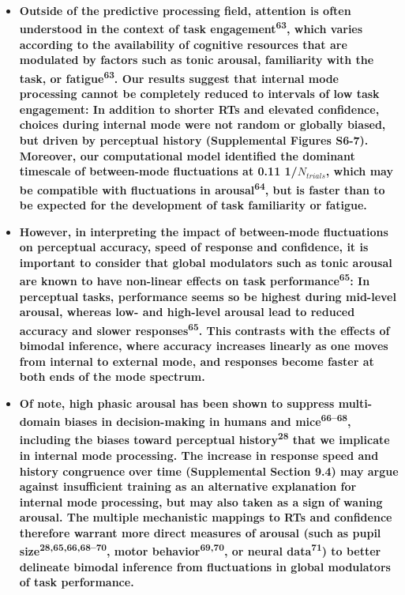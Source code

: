 \documentclass[
]{article}
\begin{document}
\begin{itemize}
\item
  \textbf{Outside of the predictive processing field, attention is often
  understood in the context of task engagement\textsuperscript{63},
  which varies according to the availability of cognitive resources that
  are modulated by factors such as tonic arousal, familiarity with the
  task, or fatigue\textsuperscript{63}. Our results suggest that
  internal mode processing cannot be completely reduced to intervals of
  low task engagement: In addition to shorter RTs and elevated
  confidence, choices during internal mode were not random or globally
  biased, but driven by perceptual history (Supplemental Figures S6-7).
  Moreover, our computational model identified the dominant timescale of
  between-mode fluctuations at 0.11 1/\(N_{trials}\), which may be
  compatible with fluctuations in arousal\textsuperscript{64}, but is
  faster than to be expected for the development of task familiarity or
  fatigue.}
\item
  \textbf{However, in interpreting the impact of between-mode
  fluctuations on perceptual accuracy, speed of response and confidence,
  it is important to consider that global modulators such as tonic
  arousal are known to have non-linear effects on task
  performance\textsuperscript{65}: In perceptual tasks, performance
  seems so be highest during mid-level arousal, whereas low- and
  high-level arousal lead to reduced accuracy and slower
  responses\textsuperscript{65}. This contrasts with the effects of
  bimodal inference, where accuracy increases linearly as one moves from
  internal to external mode, and responses become faster at both ends of
  the mode spectrum.}
\item
  \textbf{Of note, high phasic arousal has been shown to suppress
  multi-domain biases in decision-making in humans and
  mice\textsuperscript{66--68}, including the biases toward perceptual
  history\textsuperscript{28} that we implicate in internal mode
  processing. The increase in response speed and history congruence over
  time (Supplemental Section 9.4) may argue against insufficient
  training as an alternative explanation for internal mode processing,
  but may also taken as a sign of waning arousal. The multiple
  mechanistic mappings to RTs and confidence therefore warrant more
  direct measures of arousal (such as pupil
  size\textsuperscript{28,65,66,68--70}, motor
  behavior\textsuperscript{69,70}, or neural data\textsuperscript{71})
  to better delineate bimodal inference from fluctuations in global
  modulators of task performance.}
\end{itemize}
\end{document}
